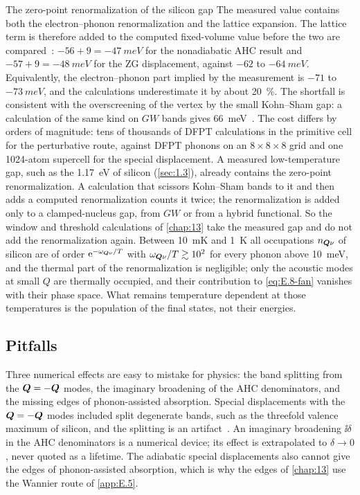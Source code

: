 \begin{workedexample}{The zero-point renormalization of the silicon gap}
The measured value contains both the electron--phonon renormalization and the lattice expansion. The lattice term is therefore added to the computed fixed-volume value before the two are compared~\cite{miglio2020predominance}: $-56 + 9 = -\SI{47}{meV}$ for the nonadiabatic AHC result and $-57 + 9 = -\SI{48}{meV}$ for the ZG displacement, against $-62$ to $-\SI{64}{meV}$. Equivalently, the electron--phonon part implied by the measurement is $-71$ to $-\SI{73}{meV}$, and the calculations underestimate it by about \SI{20}{\percent}. The shortfall is consistent with the overscreening of the vertex by the small Kohn--Sham gap: a calculation of the same kind on $GW$ bands gives \SI{66}{meV}~\cite[Sect.~VII\,B]{zacharias2020theory}. The cost differs by orders of magnitude: tens of thousands of DFPT calculations in the primitive cell for the perturbative route, against DFPT phonons on an $8\times8\times8$ grid and one 1024-atom supercell for the special displacement. A measured low-temperature gap, such as the \SI{1.17}{eV} of silicon (\cref{sec:1.3}), already contains the zero-point renormalization. A calculation that scissors Kohn--Sham bands to it and then adds a computed renormalization counts it twice; the renormalization is added only to a clamped-nucleus gap, from $GW$ or from a hybrid functional. So the window and threshold calculations of \cref{chap:13} take the measured gap and do not add the renormalization again. Between \SI{10}{mK} and \SI{1}{K} all occupations $n_{\bm{Q}\nu}$ of silicon are of order $\mathrm{e}^{-\omega_{\bm{Q}\nu}/T}$ with $\omega_{\bm{Q}\nu}/T \gtrsim 10^2$ for every phonon above \SI{10}{meV}, and the thermal part of the renormalization is negligible; only the acoustic modes at small $Q$ are thermally occupied, and their contribution to \cref{eq:E.8-fan} vanishes with their phase space. What remains temperature dependent at those temperatures is the population of the final states, not their energies.
\end{workedexample}

\subsection{Pitfalls}

Three numerical effects are easy to mistake for physics: the band splitting from the $\bm{Q} = -\bm{Q}$ modes, the imaginary broadening of the AHC denominators, and the missing edges of phonon-assisted absorption. Special displacements with the $\bm{Q} = -\bm{Q}$ modes included split degenerate bands, such as the threefold valence maximum of silicon, and the splitting is an artifact~\cite[Sect.~VII\,B]{zacharias2020theory}. An imaginary broadening $\ii\delta$ in the AHC denominators is a numerical device; its effect is extrapolated to $\delta \to 0$, never quoted as a lifetime. The adiabatic special displacements also cannot give the edges of phonon-assisted absorption, which is why the edges of \cref{chap:13} use the Wannier route of \cref{app:E.5}.
